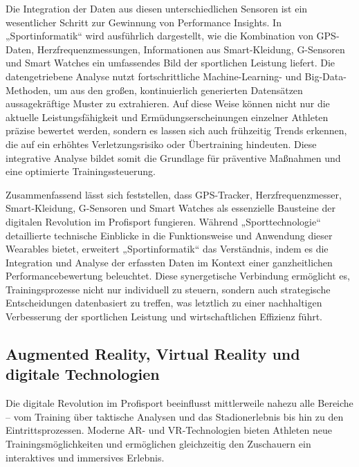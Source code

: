 \documentclass[
  number]{elsarticle}
\begin{document}
Die Integration der Daten aus diesen unterschiedlichen Sensoren ist ein
wesentlicher Schritt zur Gewinnung von Performance Insights. In
„Sportinformatik`` wird ausführlich dargestellt, wie die Kombination von
GPS-Daten, Herzfrequenzmessungen, Informationen aus Smart-Kleidung,
G-Sensoren und Smart Watches ein umfassendes Bild der sportlichen
Leistung liefert. Die datengetriebene Analyse nutzt fortschrittliche
Machine-Learning- und Big-Data-Methoden, um aus den großen,
kontinuierlich generierten Datensätzen aussagekräftige Muster zu
extrahieren. Auf diese Weise können nicht nur die aktuelle
Leistungsfähigkeit und Ermüdungserscheinungen einzelner Athleten präzise
bewertet werden, sondern es lassen sich auch frühzeitig Trends erkennen,
die auf ein erhöhtes Verletzungsrisiko oder Übertraining hindeuten.
Diese integrative Analyse bildet somit die Grundlage für präventive
Maßnahmen und eine optimierte Trainingssteuerung.
\citep[pp.~160--165]{memmert_sportinformatik}

Zusammenfassend lässt sich feststellen, dass GPS-Tracker,
Herzfrequenzmesser, Smart-Kleidung, G-Sensoren und Smart Watches als
essenzielle Bausteine der digitalen Revolution im Profisport fungieren.
Während „Sporttechnologie`` detaillierte technische Einblicke in die
Funktionsweise und Anwendung dieser Wearables bietet, erweitert
„Sportinformatik`` das Verständnis, indem es die Integration und Analyse
der erfassten Daten im Kontext einer ganzheitlichen Performancebewertung
beleuchtet. Diese synergetische Verbindung ermöglicht es,
Trainingsprozesse nicht nur individuell zu steuern, sondern auch
strategische Entscheidungen datenbasiert zu treffen, was letztlich zu
einer nachhaltigen Verbesserung der sportlichen Leistung und
wirtschaftlichen Effizienz führt.
\citetext{\citealp[pp.~29--36]{memmert_sporttechnologie}; \citealp[pp.~160--162]{memmert_sportinformatik}}

\subsection{Augmented Reality, Virtual Reality und digitale
Technologien}\label{augmented-reality-virtual-reality-und-digitale-technologien}

Die digitale Revolution im Profisport beeinflusst mittlerweile nahezu
alle Bereiche -- vom Training über taktische Analysen und das
Stadionerlebnis bis hin zu den Eintrittsprozessen. Moderne AR- und
VR-Technologien bieten Athleten neue Trainingsmöglichkeiten und
ermöglichen gleichzeitig den Zuschauern ein interaktives und immersives
Erlebnis.
\end{document}
